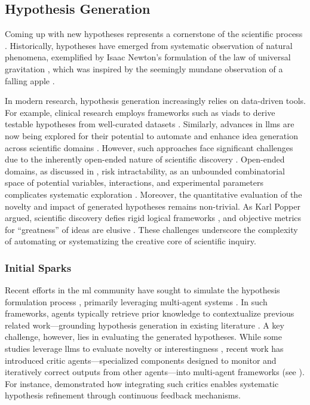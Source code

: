 \subsection{Hypothesis Generation} \label{sec:hypothesis-gen}

Coming up with new hypotheses represents a cornerstone of the scientific process \autocite{rock2018hypothesis}. Historically, hypotheses have emerged from systematic observation of natural phenomena, exemplified by Isaac Newton’s formulation of the law of universal gravitation \autocite{newton1999principia}, which was inspired by the seemingly mundane observation of a falling apple \autocite{kosso2017whatgoesup}.

In modern research, hypothesis generation increasingly relies on data-driven tools. 
For example, clinical research employs frameworks such as \gls{viads} to derive testable hypotheses from well-curated datasets \autocite{Jing2022roles}. Similarly, advances in \glspl{llm} are now being explored for their potential to automate and enhance idea generation across scientific domains \autocite{oneill2025sparks}. However, such approaches face significant challenges due to the inherently open-ended nature of scientific discovery \autocite{stanley2017openendedness}. 
Open-ended domains, as discussed in , risk intractability, as an unbounded combinatorial space of potential variables, interactions, and experimental parameters complicates systematic exploration \autocite{clune2019ai0gas0}.
Moreover, the quantitative evaluation of the novelty and impact of generated hypotheses remains non-trivial. 
As Karl Popper argued, scientific discovery defies rigid logical frameworks \autocite{popper1959logic}, and objective metrics for \enquote{greatness} of ideas are elusive \autocite{stanley2015greatness}. These challenges underscore the complexity of automating or systematizing the creative core of scientific inquiry.

\subsubsection{Initial Sparks}

Recent efforts in the \gls{ml} community have sought to simulate the hypothesis formulation process \autocite{Gu2025forecasting, arlt2024meta0designing}, primarily leveraging multi-agent systems \autocite{jansen2025codescientist0, kumbhar2025hypothesis}. 
In such frameworks, agents typically retrieve prior knowledge to contextualize previous related work---grounding hypothesis generation in existing literature \autocite{naumov2025dora, ghareeb2025robin0, gu2024interesting}. 
A key challenge, however, lies in evaluating the generated hypotheses. 
While some studies leverage \glspl{llm} to evaluate novelty or interestingness \autocite{zhang2024omni0}, recent work has introduced critic agents---specialized components designed to monitor and iteratively correct outputs from other agents---into multi-agent frameworks (see ). 
For instance, \textcite{Ghafarollahi2024} demonstrated how integrating such critics enables systematic hypothesis refinement through continuous feedback mechanisms.

